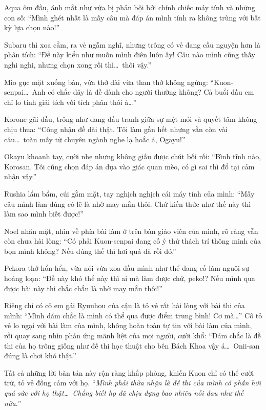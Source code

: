 \documentclass[../main.tex]{subfiles}
\begin{document}
Aqua ôm đầu, ánh mắt như vừa bị phản bội bởi chính chiếc máy tính và những con số: ``Mình ghét nhất là mấy câu mà đáp án mình tính ra không trùng với bất kỳ lựa chọn nào!''

Subaru thì xoa cằm, ra vẻ ngẫm nghĩ, nhưng trông có vẻ đang cầu nguyện hơn là phân tích: ``Đề này kiểu như muốn mình điên luôn ấy! Câu nào mình cũng thấy nghi nghi, nhưng chọn xong rồi thì\dots\ thôi vậy.''

Mio gục mặt xuống bàn, vừa thở dài vừa than thở không ngừng: ``Kuon-senpai\dots\ Anh có chắc đây là đề dành cho người thường không? Cả buổi đầu em chỉ lo tính giải tích với tích phân thôi á\dots''

Korone gãi đầu, trông như đang đấu tranh giữa sự mệt mỏi và quyết tâm không chịu thua: ``Công nhận đề dài thật. Tôi làm gần hết nhưng vẫn còn vài câu\dots\ toàn mấy từ chuyên ngành nghe lạ hoắc á, Ogayu!''

Okayu khoanh tay, cười nhẹ nhưng không giấu được chút bối rối: ``Bình tĩnh nào, Korosan. Tôi cũng chọn đáp án dựa vào giác quan mèo, có gì sai thì đổ tại cảm nhận vậy.''

Rushia lẩm bẩm, cúi gằm mặt, tay nghịch nghịch cái máy tính của mình: ``Mấy câu mình làm đúng có lẽ là nhờ may mắn thôi. Chứ kiến thức như thế này thì làm sao mình biết được!''

Noel nhăn mặt, nhìn về phía bài làm ở trên bàn giáo viên của mình, rõ ràng vẫn còn chưa hài lòng: ``Có phải Kuon-senpai đang cố ý thử thách trí thông minh của bọn mình không? Nếu đúng thế thì hơi quá đà rồi đó.''

Pekora thở hổn hển, vừa nói vừa xoa đầu mình như thể đang cố làm nguôi sự hoảng loạn: ``Đề này khó thế này thì ai mà làm được chứ, peko!? Nếu mình qua được bài này thì chắc chắn là nhờ may mắn thôi!''

Riêng chỉ có cô em gái Ryuuhou của cậu là tỏ vẻ rất hài lòng với bài thi của mình: ``Mình dám chắc là mình có thể qua được điểm trung bình! Cơ mà\dots'' Cô tỏ vẻ lo ngại với bài làm của mình, không hoàn toàn tự tin với bài làm của mình, rồi quay sang nhìn phản ứng mãnh liệt của mọi người, cười khổ: ``Dám chắc là đề thi của họ trông giống như đề thi học thuật cho bên Bách Khoa vậy á\dots\ Onii-san đúng là chơi khó thật.''

Tất cả những lời bàn tán này rộn ràng khắp phòng, khiến Kuon chỉ có thể cười trừ, tỏ vẻ đồng cảm với họ. ``\textit{Mình phải thừa nhận là đề thi của mình có phần hơi quá sức với họ thật\dots\ Chẳng biết họ đã chịu đựng bao nhiêu nỗi đau như thế nữa.}''
\end{document}
